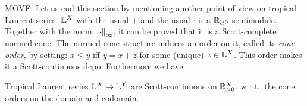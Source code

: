 {\color{red}MOVE:
Let us end this section by mentioning another point of view on tropical Laurent series.
$\mathbb{L}^X$ with the usual $+$ and the usual $\cdot$ is a $\mathbb{R}_{\geq0}$-semimodule.
Together with the norm $\left\lVert\cdot\right\rVert_\infty$, it can be proved that it is a Scott-complete normed cone.
The normed cone structure induces an order on it, called its \emph{cone order}, by setting:
$x\leq y$ iff $y=x+z$ for some (unique) $z\in\mathbb{L}^X$.
This order makes it a Scott-continuous dcpo.
Furthermore we have:

\begin{proposition}
  Tropical Laurent series $\mathbb{L}^X\to\mathbb{L}^Y$ are Scott-continuous on $\mathbb{R}_{>0}^X$, w.r.t.\ the cone orders on the domain and codomain.
\end{proposition}
}
